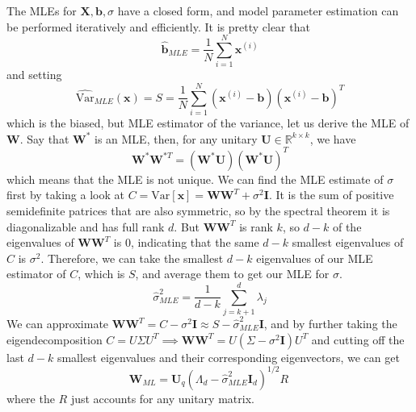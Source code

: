   \begin{theorem}
    The MLEs for $\mathbf{X}, \mathbf{b}, \sigma$ have a closed form, and model parameter estimation can be performed iteratively and efficiently. It is pretty clear that 
    \begin{equation}
      \hat{\mathbf{b}}_{MLE} = \frac{1}{N} \sum_{i=1}^N \mathbf{x}^{(i)}
    \end{equation}
    and setting 
    \begin{equation}
      \widehat{\mathrm{Var}}_{MLE}(\mathbf{x}) = S = \frac{1}{N} \sum_{i=1}^N (\mathbf{x}^{(i)} - \mathbf{b}) (\mathbf{x}^{(i)} - \mathbf{b})^T
    \end{equation}
    which is the biased, but MLE estimator of the variance, let us derive the MLE of $\mathbf{W}$. Say that $\mathbf{W}^\ast$ is an MLE, then, for any unitary $\mathbf{U} \in \mathbb{R}^{k \times k}$, we have 
    \begin{equation}
      \mathbf{W}^\ast \mathbf{W}^{\ast T} = (\mathbf{W}^\ast \mathbf{U}) (\mathbf{W}^\ast \mathbf{U})^T
    \end{equation}
    which means that the MLE is not unique. We can find the MLE estimate of $\sigma$ first by taking a look at $C = \mathrm{Var}[\mathbf{x}] = \mathbf{W} \mathbf{W}^T + \sigma^2 \mathbf{I}$. It is the sum of positive semidefinite patrices that are also symmetric, so by the spectral theorem it is diagonalizable and has full rank $d$. But $\mathbf{W} \mathbf{W}^T$ is rank $k$, so $d - k$ of the eigenvalues of $\mathbf{W} \mathbf{W}^T$ is $0$, indicating that the same $d-k$ smallest eigenvalues of $C$ is $\sigma^2$. Therefore, we can take the smallest $d-k$ eigenvalues of our MLE estimator of $C$, which is $S$, and average them to get our MLE for $\sigma$. 
    \begin{equation}
      \hat{\sigma}^2_{MLE} = \frac{1}{d-k} \sum_{j=k+1}^d \lambda_j
    \end{equation}
    We can approximate $\mathbf{W} \mathbf{W}^T = C - \sigma^2 \mathbf{I} \approx S - \hat{\sigma}^2_{MLE} \mathbf{I}$, and by further taking the eigendecomposition $C = U \Sigma U^T \implies \mathbf{W} \mathbf{W}^T = U (\Sigma - \sigma^2 \mathbf{I}) U^T$ and cutting off the last $d-k$ smallest eigenvalues and their corresponding eigenvectors, we can get 
    \begin{equation}
      \mathbf{W}_{ML} = \mathbf{U}_q (\Lambda_d - \hat{\sigma}_{MLE}^2 \mathbf{I}_d )^{1/2} R\
    \end{equation}
    where the $R$ just accounts for any unitary matrix. 
  \end{theorem}

